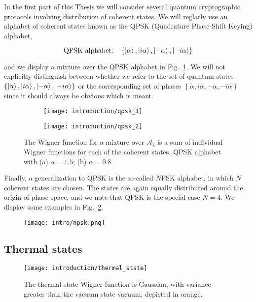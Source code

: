 \noindent In the first part of this Thesis we will consider several quantum cryptographic protocols involving distribution of coherent states. We will reglarly use an alphabet of coherent states known as the QPSK (Quadrature Phase-Shift Keying) alphabet, 

\begin{equation}
\qq*{QPSK alphabet:} \left\{\ket{\alpha}, \ket{i \alpha}, \ket{- \alpha}, \ket{- i \alpha}\right\}
\end{equation}

and we display a mixture over the QPSK alphabet in Fig.~\ref{fig:qpsk}. We will not explicitly distinguish between whether we refer to the set of quantum states $\left\{\ket{\alpha}, \ket{i \alpha}, \ket{- \alpha}, \ket{- i \alpha}\right\}$ or the corresponding set of phases $\left\{ \alpha, i \alpha, -\alpha, - i\alpha\right\}$ since it should always be obvious which is meant.


\begin{figure}[htp]
\captionsetup{width=0.8\linewidth}
\centering
\begin{subfigure}[b]{0.4\linewidth}
\texttt{[image: introduction/qpsk\_1]}
\caption{}
\end{subfigure}
\begin{subfigure}[b]{0.4\linewidth}
\texttt{[image: introduction/qpsk\_2]}
\caption{}
\end{subfigure}
\caption{\label{fig:qpsk} The Wigner function for a mixture over $\mathcal{A}_4$ is a sum of individual Wigner functions for each of the coherent states. QPSK alphabet with (a) $\alpha=1.5$; (b) $\alpha=0.8$ }
\end{figure}

Finally, a generalization to QPSK is the so-called $N$PSK alphabet, in which $N$ coherent states are chosen. The states are again equally distributed around the origin of phase space, and we note that QPSK is the special case $N=4$. We display some examples in Fig.~\ref{fig:intro_npsk}.

\begin{figure}[htp]
\centering
\texttt{[image: intro/npsk.png]}
\caption{\label{fig:intro_npsk}}
\end{figure}

\FloatBarrier
\subsection{Thermal states}
\begin{figure}[htp]
\centering
\texttt{[image: introduction/thermal\_state]}
\caption{\label{fig:thermal_state} The thermal state Wigner function is Gaussian, with variance greater than the vacuum state vacuum, depicted in orange.}
\end{figure}
